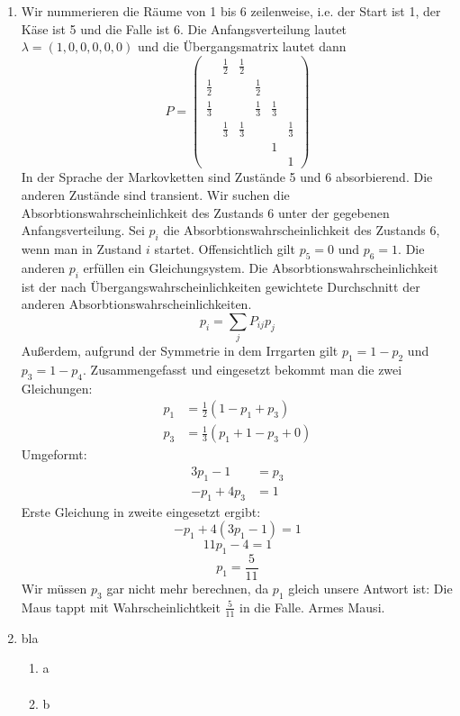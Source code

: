 \documentclass[a4paper,11pt,notitlepage,fullpage]{article}
\begin{document}
\begin{enumerate}
\item Wir nummerieren die Räume von 1 bis 6 zeilenweise, i.e. der Start ist 1, der Käse ist 5 und die Falle ist 6. Die Anfangsverteilung lautet $\lambda = (1,0,0,0,0,0)$ und die Übergangsmatrix lautet dann
$$P = \begin{pmatrix}
&\frac{1}{2}&\frac{1}{2}&&& \\
\frac{1}{2}&&&\frac{1}{2}&& \\
\frac{1}{3}&&&\frac{1}{3}&\frac{1}{3}& \\
&\frac{1}{3}&\frac{1}{3}&&&\frac{1}{3} \\
&&&&1& \\
&&&&&1 
\end{pmatrix}$$
In der Sprache der Markovketten sind Zustände 5 und 6 absorbierend. Die anderen Zustände sind transient. Wir suchen die Absorbtionswahrscheinlichkeit des Zustands 6 unter der gegebenen Anfangsverteilung.
Sei $p_i$ die Absorbtionswahrscheinlichkeit des Zustands 6, wenn man in Zustand $i$ startet. Offensichtlich gilt $p_5 = 0$ und $p_6 = 1$. Die anderen $p_i$ erfüllen ein Gleichungsystem. Die Absorbtionswahrscheinlichkeit ist der nach Übergangswahrscheinlichkeiten gewichtete Durchschnitt der anderen Absorbtionswahrscheinlichkeiten.
$$p_i = \sum_j P_{ij} p_j$$
Außerdem, aufgrund der Symmetrie in dem Irrgarten gilt $p_1 = 1 - p_2$ und $p_3 = 1-p_4$. Zusammengefasst und eingesetzt bekommt man die zwei Gleichungen:
\begin{align*}
p_1 &= \frac{1}{2}(1 - p_1 + p_3) \\
p_3 &= \frac{1}{3}(p_1 + 1 - p_3 + 0)
\end{align*}
Umgeformt:
\begin{align*}
3 p_1 - 1&= p_3 \\
- p_1 + 4 p_3 &= 1
\end{align*}
Erste Gleichung in zweite eingesetzt ergibt:
$$- p_1 + 4 (3 p_1 - 1) = 1$$
$$11 p_1 - 4 = 1$$
$$p_1 = \frac{5}{11}$$
Wir müssen $p_3$ gar nicht mehr berechnen, da $p_1$ gleich unsere Antwort ist: Die Maus tappt mit Wahrscheinlichtkeit $\frac{5}{11}$ in die Falle. Armes Mausi.

\item bla
\begin{enumerate}
\item a
\begin{align*}
\end{align*}

\item b
\begin{align*}
\end{align*}
\end{enumerate}


\end{enumerate}
\end{document}
